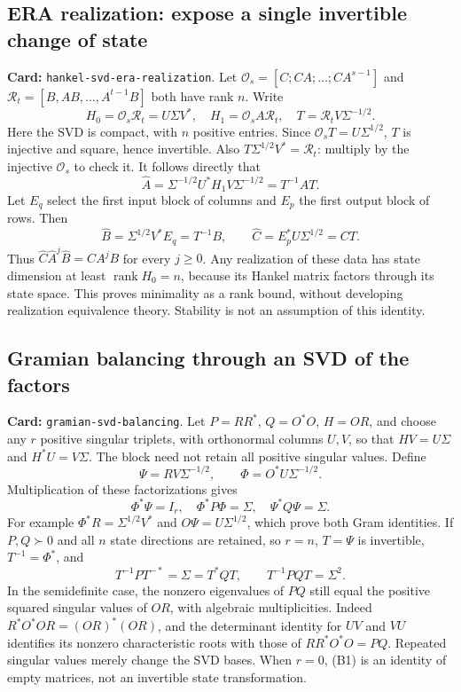 \documentclass[11pt,a4paper]{article}
\DeclareMathOperator{\rank}{rank}
\DeclareRobustCommand{\code}[1]{{\footnotesize\urlstyle{tt}\nolinkurl{#1}}}
\begin{document}
\subsection{ERA realization: expose a single invertible change of state}
\label{route:hankel-svd-era-realization}
\textbf{Card:} \code{hankel-svd-era-realization}.
Let $\mathcal O_s=[C;CA;\ldots;CA^{s-1}]$ and
$\mathcal R_t=[B,AB,\ldots,A^{t-1}B]$ both have rank $n$.
Write
\[
 H_0=\mathcal O_s\mathcal R_t=U\Sigma V^*,\quad
 H_1=\mathcal O_sA\mathcal R_t,\quad
 T=\mathcal R_tV\Sigma^{-1/2}.
\]
Here the SVD is compact, with $n$ positive entries. Since
$\mathcal O_sT=U\Sigma^{1/2}$, $T$ is injective and square, hence invertible.
Also $T\Sigma^{1/2}V^*=\mathcal R_t$: multiply by the injective
$\mathcal O_s$ to check it. It follows directly that
\[
 \widehat A=\Sigma^{-1/2}U^*H_1V\Sigma^{-1/2}=T^{-1}AT.
\]
Let $E_q$ select the first input block of columns and $E_p$ the first output
block of rows. Then
\[
 \widehat B=\Sigma^{1/2}V^*E_q=T^{-1}B,\qquad
 \widehat C=E_p^*U\Sigma^{1/2}=CT.
\]
Thus $\widehat C\widehat A^j\widehat B=CA^jB$ for every $j\ge0$.
Any realization of these data has state dimension at least $\rank H_0=n$,
because its Hankel matrix factors through its state space. This proves
minimality as a rank bound, without developing realization equivalence
theory. Stability is not an assumption of this identity.

\subsection{Gramian balancing through an SVD of the factors}
\label{route:gramian-svd-balancing}
\textbf{Card:} \code{gramian-svd-balancing}.
Let $P=RR^*$, $Q=O^*O$, $H=OR$, and choose any $r$ positive singular
triplets, with orthonormal columns $U,V$, so that
$HV=U\Sigma$ and $H^*U=V\Sigma$.
The block need not retain all positive singular values. Define
\[
 \Psi=RV\Sigma^{-1/2},\qquad \Phi=O^*U\Sigma^{-1/2}.
\]
Multiplication of these factorizations gives
\[
 \Phi^*\Psi=I_r,\quad \Phi^*P\Phi=\Sigma,\quad
 \Psi^*Q\Psi=\Sigma. \tag{B1}
\]
For example $\Phi^*R=\Sigma^{1/2}V^*$ and $O\Psi=U\Sigma^{1/2}$,
which prove both Gram identities. If $P,Q\succ0$ and all $n$ state
directions are retained, so $r=n$,
$T=\Psi$ is invertible, $T^{-1}=\Phi^*$, and
\[
 T^{-1}PT^{-*}=\Sigma=T^*QT,\qquad T^{-1}PQT=\Sigma^2.
\]
In the semidefinite case, the nonzero eigenvalues of $PQ$ still equal the
positive squared singular values of $OR$, with algebraic multiplicities.
Indeed $R^*O^*OR=(OR)^*(OR)$, and the determinant identity for $UV$ and
$VU$ identifies its nonzero characteristic roots with those of
$RR^*O^*O=PQ$. Repeated singular values merely change the SVD bases.
When $r=0$, (B1) is an identity of empty matrices, not an invertible state
transformation.
\end{document}
